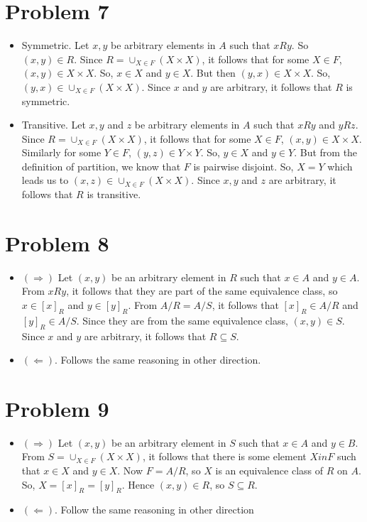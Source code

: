 \documentclass{article}
\begin{document}
\section{Problem 7}
\begin{itemize}
\item Symmetric. Let $x,y$ be arbitrary elements in $A$ such that
  $xRy$. So $(x,y) \in R$. Since $R = \cup_{X \in F}(X \times X)$, it
  follows that for some $X \in F$, $(x,y) \in X \times X$. So, $x \in
  X$ and $y \in X$. But then $(y,x) \in X \times X$. So, $(y,x) \in
  \cup_{X \in F}(X \times X)$. Since $x$ and $y$ are arbitrary, it
  follows that $R$ is symmetric.
\item Transitive. Let $x,y$ and $z$ be arbitrary elements in $A$ such
  that $xRy$ and $yRz$. Since $R = \cup_{X \in F}(X \times X)$, it
  follows that for some $X \in F$, $(x,y) \in X \times X$. Similarly
  for some $Y \in F$, $(y,z) \in Y \times Y$. So, $y \in X$ and $y \in
  Y$. But from the definition of partition, we know that $F$ is
  pairwise disjoint. So, $X=Y$ which leads us to $(x,z) \in \cup_{X
    \in F}(X \times X)$. Since $x,y$ and $z$ are arbitrary, it follows
  that $R$ is transitive.
\end{itemize}

\section{Problem 8}
\begin{itemize}
\item $(\Rightarrow)$ Let $(x,y)$ be an arbitrary element in $R$ such
  that $x \in A$ and $y \in A$. From $xRy$, it follows that they are
  part of the same equivalence class, so $x \in [x]_R$ and
  $y \in [y]_R$. From $A/R = A/S$, it follows that $[x]_R \in A/R$ and
  $[y]_R \in A/S$. Since they are from the same equivalence class,
  $(x,y) \in S$. Since $x$ and $y$ are arbitrary, it follows that
  $R \subseteq S$.
\item $(\Leftarrow)$. Follows the same reasoning in other direction.
\end{itemize}

\section{Problem 9}
\begin{itemize}
\item $(\Rightarrow)$ Let $(x,y)$ be an arbitrary element in $S$ such
  that $x \in A$ and $y \in B$. From $S=\cup_{X \in F}(X \times X)$,
  it follows that there is some element $X in F$ such that $x \in X$
  and $y \in X$. Now $F = A/R$, so $X$ is an equivalence class of $R$
  on $A$. So, $X = [x]_R = [y]_R$. Hence $(x,y) \in R$, so $S
  \subseteq R$.
\item $(\Leftarrow)$. Follow the same reasoning in other direction
\end{itemize}
\end{document}
